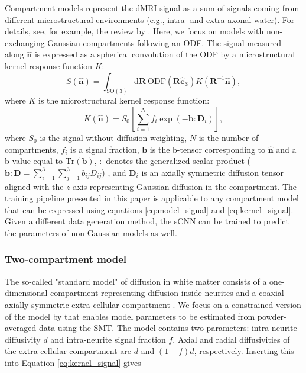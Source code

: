 \documentclass[10pt, letterpaper, oneside]{article}
\begin{document}
Compartment models represent the dMRI signal as a sum of signals coming from different microstructural environments (e.g., intra- and extra-axonal water). For details, see, for example, the review by \cite{jelescu2017design}. Here, we focus on models with non-exchanging Gaussian compartments following an ODF. The signal measured along $\mathbf{\hat{n}}$ is expressed as a spherical convolution of the ODF by a microstructural kernel response function $K$: 
\begin{equation}\label{eq:model_signal}
S(\mathbf{\hat{n}}) = \int_{\text{SO}(3)} \text{d}\mathbf{R} \ \text{ODF}(\mathbf{R} \mathbf{\hat{e}_3}) K(\mathbf{R}^{-1} \mathbf{\hat{n}}) ,
\end{equation}
where $K$ is the microstructural kernel response function:
\begin{equation}\label{eq:kernel_signal}
K(\mathbf{\hat{n}}) = S_0 \left[ \sum_{i=1}^N f_i \exp(- \mathbf{b}:\mathbf{D}_i) \right] ,
\end{equation}
where $S_0$ is the signal without diffusion-weighting, $N$ is the number of compartments, $f_i$ is a signal fraction, $\mathbf{b}$ is the b-tensor corresponding to $\mathbf{\hat{n}}$ and a b-value equal to $\text{Tr}(\mathbf{b})$, $:$ denotes the generalized scalar product ($\mathbf{b}:\mathbf{D} = \sum_{i=1}^3 \sum_{j=1}^3 b_{ij} D_{ij}$) \citep{westin2016q}, and $\mathbf{D}_i$ is an axially symmetric diffusion tensor aligned with the $z$-axis representing Gaussian diffusion in the compartment. The training pipeline presented in this paper is applicable to any compartment model that can be expressed using equations \ref{eq:model_signal} and \ref{eq:kernel_signal}. Given a different data generation method, the sCNN can be trained to predict the parameters of non-Gaussian models as well.

\subsubsection{Two-compartment model}

The so-called "standard model" of diffusion in white matter consists of a one-dimensional compartment representing diffusion inside neurites and a coaxial axially symmetric extra-cellular compartment \citep{novikov2019quantifying}. We focus on a constrained version of the model by \cite{kaden2016multi} that enables model parameters to be estimated from powder-averaged data using the SMT. The model contains two parameters: intra-neurite diffusivity $d$ and intra-neurite signal fraction $f$. Axial and radial diffusivities of the extra-cellular compartment are $d$ and $(1 - f)d$, respectively. Inserting this into Equation \ref{eq:kernel_signal} gives
\end{document}
